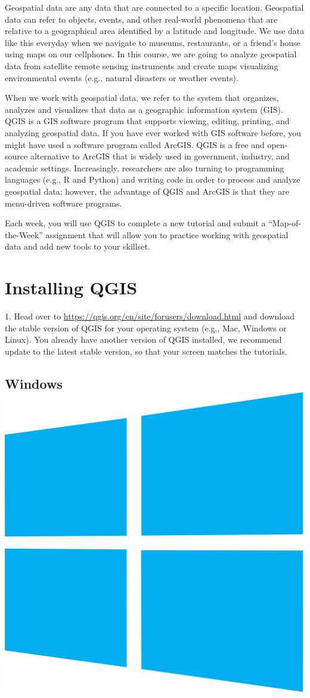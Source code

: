 \documentclass[oneside,a4paper,11pt,explicit]{book}
\begin{document}
Geospatial data are any data that are connected to a specific location. Geospatial data can refer to objects, events, and other real-world phenomena that are relative to a geographical area identified by a latitude and longitude. We use data like this everyday when we navigate to museums, restaurants, or a friend's house using maps on our cellphones. In this course, we are going to analyze geospatial data from satellite remote sensing instruments and create maps visualizing environmental events (e.g., natural disasters or weather events). 

When we work with geospatial data, we refer to the system that organizes, analyzes and visualizes that data as a geographic information system (GIS). QGIS is a GIS software program that supports viewing, editing, printing, and analyzing geospatial data.  If you have ever worked with GIS software before, you might have used a software program called ArcGIS. QGIS is a free and open-source alternative to ArcGIS that is widely used in government, industry, and academic settings. Increasingly, researchers are also turning to programming languages (e.g., R and Python) and writing code in order to process and analyze geospatial data; however, the advantage of QGIS and ArcGIS is that they are menu-driven software programs. 

Each week, you will use QGIS to complete a new tutorial and submit a ``Map-of-the-Week'' assignment that will allow you to practice working with geospatial data and add new tools to your skillset. 

\section{Installing QGIS}

1. Head over to \href{https://qgis.org/en/site/forusers/download.html}{https://qgis.org/en/site/forusers/download.html} and download the stable version of QGIS for your operating system (e.g., Mac, Windows or Linux). You already have another version of QGIS installed, we recommend update to the latest stable version, so that your screen matches the tutorials.


\subsection{Windows \includegraphics[width=.025\textwidth]{WindowsLogo.png}}
\end{document}
